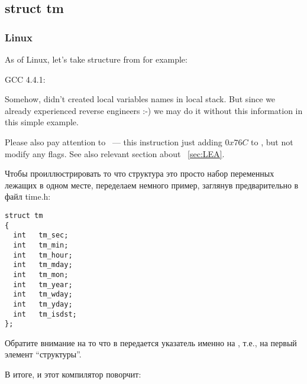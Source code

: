 \subsection{struct tm}

\subsubsection{Linux}

{As of Linux, let's take  structure from  for example:}



 GCC 4.4.1:

\IFRU{}{}

{Somehow, \IDA didn't created local variables names in local stack.
But since we already experienced reverse engineers :-) we may do it without this information in 
this simple example.}

{Please also pay attention to  ~--- this instruction just adding $0x76C$ to \EAX,
but not modify any flags. See also relevant section about \LEA{}~\ref{sec:LEA}.}

Чтобы проиллюстрировать то что структура это просто набор переменных лежащих в одном месте, переделаем немного
пример, заглянув предварительно в файл time.h:

\begin{lstlisting}[caption=time.h]
struct tm
{
  int	tm_sec;
  int	tm_min;
  int	tm_hour;
  int	tm_mday;
  int	tm_mon;
  int	tm_year;
  int	tm_wday;
  int	tm_yday;
  int	tm_isdst;
};
\end{lstlisting}



Обратите внимание на то что в  передается указатель именно на , 
т.е., на первый элемент ``структуры''.

В итоге, и этот компилятор поворчит:

